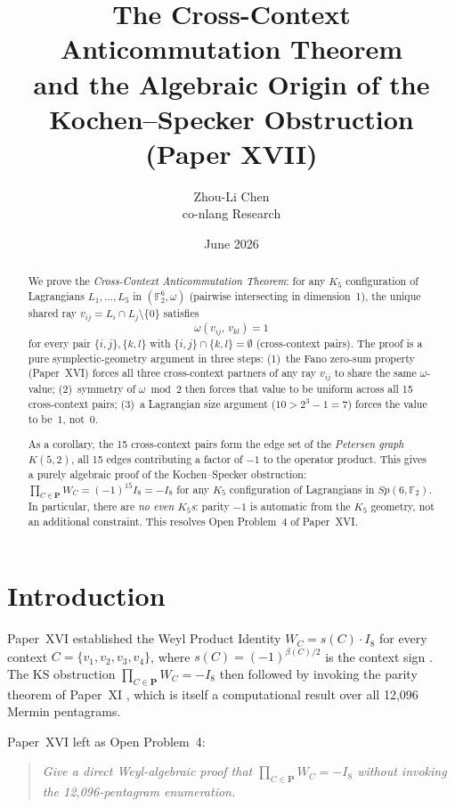 \documentclass[11pt,a4paper]{article}
\title{The Cross-Context Anticommutation Theorem\\
       and the Algebraic Origin of the Kochen--Specker Obstruction\\
       {\large (Paper XVII)}}
\author{Zhou-Li Chen \\ co-nlang Research}
\date{June 2026}
\theoremstyle{remark}
\begin{document}
\maketitle

\begin{abstract}
We prove the \emph{Cross-Context Anticommutation Theorem}:
for any $K_5$ configuration of Lagrangians
$L_1, \ldots, L_5$ in $(\mathbb{F}_2^6, \omega)$
(pairwise intersecting in dimension~1),
the unique shared ray $v_{ij} = L_i \cap L_j \setminus \{0\}$
satisfies
\[
  \omega(v_{ij},\, v_{kl}) = 1
\]
for every pair $\{i,j\}, \{k,l\}$ with $\{i,j\} \cap \{k,l\} = \emptyset$
(cross-context pairs).
The proof is a pure symplectic-geometry argument in three steps:
(1)~the Fano zero-sum property (Paper~XVI)
forces all three cross-context partners of any ray $v_{ij}$
to share the same $\omega$-value;
(2)~symmetry of $\omega \bmod 2$ then forces that value to be uniform
across all 15 cross-context pairs;
(3)~a Lagrangian size argument ($10 > 2^3 - 1 = 7$) forces the value
to be~$1$, not~$0$.

As a corollary, the 15 cross-context pairs form the edge set of the
\emph{Petersen graph} $K(5,2)$, all 15 edges contributing a factor of
$-1$ to the operator product.
This gives a purely algebraic proof of the
Kochen--Specker obstruction:
$\prod_{C \in \mathbf{P}} W_C = (-1)^{15} I_8 = -I_8$
for any $K_5$ configuration of Lagrangians in $Sp(6,\mathbb{F}_2)$.
In particular, there are \emph{no even $K_5$s}:
parity $-1$ is automatic from the $K_5$ geometry,
not an additional constraint.
This resolves Open Problem~4 of Paper~XVI.
\end{abstract}


\section{Introduction}

Paper~XVI established the Weyl Product Identity $W_C = s(C) \cdot I_8$
for every context $C = \{v_1, v_2, v_3, v_4\}$,
where $s(C) = (-1)^{\beta(C)/2}$ is the context sign \cite{PaperXVI}.
The KS obstruction $\prod_{C \in \mathbf{P}} W_C = -I_8$
then followed by invoking the parity theorem of Paper~XI \cite{PaperXI},
which is itself a computational result over all 12{,}096 Mermin pentagrams.

Paper~XVI left as Open Problem~4:

\begin{quote}
\emph{Give a direct Weyl-algebraic proof that
$\prod_{C \in \mathbf{P}} W_C = -I_8$
without invoking the 12{,}096-pentagram enumeration.}
\end{quote}
\end{document}
